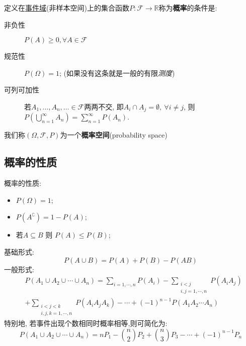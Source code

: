 \begin{definition}[概率空间]
    定义在\underline{事件域}(非样本空间)上的集合函数$P : \mathscr{F} \to \mathbb{R}$称为\textbf{概率}的条件是:
    \begin{description}
        \item[非负性] $P(A)\ge 0 , \forall A \in \mathscr{F}$
        \item[规范性] $P(\Omega) = 1$; (如果没有这条就是一般的{\color{lightgray}有限}\emph{测度})
        \item[可列可加性] 若$A_{1},\dots,A_{n},\ldots \in \mathscr{F}$两两不交, 即$A_{i}\cap A_{j} = \emptyset, \ \forall i\neq j$, 则$P(\bigcup_{n=1}^{\infty}A_{n}) = \sum_{n=1}^{\infty}P(A_{n})$.
    \end{description}
    我们称$(\Omega,\mathscr{F},P)$为一个\textbf{概率空间}(probability space)
\end{definition}

\subsection{概率的性质}

\begin{property}
    概率的性质:
    \begin{itemize}
        \item $P(\Omega)=1$;
        \item $P(A^{\complement})=1-P(A)$;
        \item 若$A \subseteq B $ 则 $P(A)\le P(B)$;
    \end{itemize}
\end{property}

\begin{corollary}[加法公式]
    基础形式:
    \[ P(A \cup B) = P(A) + P(B) - P(AB) \]
    一般形式:
    \begin{align*}
         & P\left(A_{1} \cup A_{2} \cup \cdots \cup A_{n}\right) =  \sum_{i=1, \cdots, n} P\left(A_{i}\right)-\sum_{\substack{i<j \\
        i, j=1, \cdots, n}} P\left(A_{i} A_{j}\right)                                                                             \\
         & +\sum_{\substack{i<j<k                                                                                                 \\i, j, k=1, \cdots, n}} P\left(A_{i} A_{j} A_{k}\right)-\cdots+(-1)^{n-1} P\left(A_{1} A_{2} \cdots A_{n}\right)
    \end{align*}
    特别地, 若事件出现个数相同时概率相等,则可简化为:
    \[ P\left(A_{1} \cup A_{2} \cup \cdots \cup A_{n}\right)=n P_{1} - \binom{n}{2} P_{2} + \binom{n}{3} P_{3}- \cdots+(-1)^{n-1} P_{n} \]
\end{corollary}

